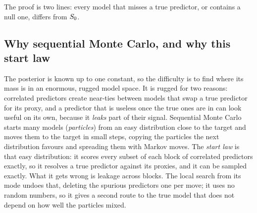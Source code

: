 The proof is two lines: every model that misses a true predictor, or contains a null one, differs from $S_0$.

\subsection{Why sequential Monte Carlo, and why this start law}\label{sec:intuition}

The posterior is known up to one constant, so the difficulty is to find where its mass is in an enormous, rugged model
space. It is rugged for two reasons: correlated predictors create near-ties between models that swap a true predictor for
its proxy, and a predictor that is useless once the true ones are in can look useful on its own, because it \emph{leaks}
part of their signal. Sequential Monte Carlo starts many models (\emph{particles}) from an easy distribution close to the
target and moves them to the target in small steps, copying the particles the next distribution favours and spreading
them with Markov moves. The \emph{start law} is that easy distribution: it scores every subset of each block of correlated
predictors exactly, so it resolves a true predictor against its proxies, and it can be sampled exactly. What it gets wrong
is leakage across blocks. The local search from its mode undoes that, deleting the spurious predictors one per move; it
uses no random numbers, so it gives a second route to the true model that does not depend on how well the particles
mixed.

